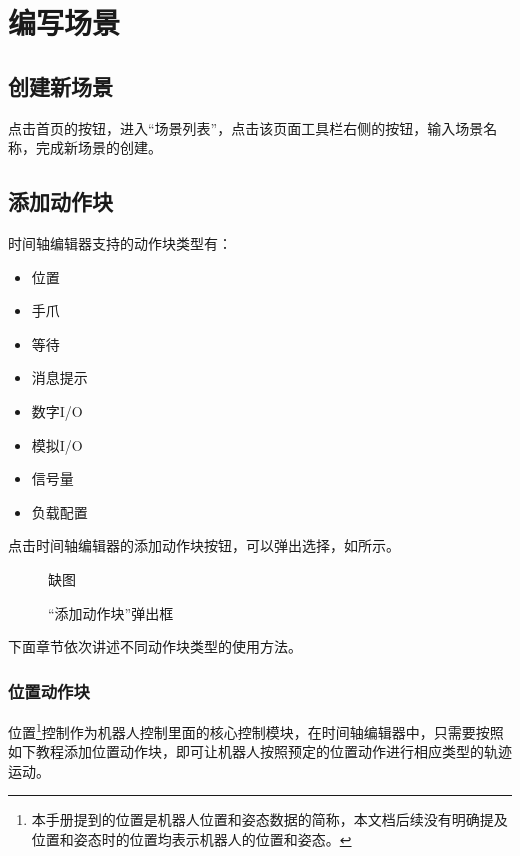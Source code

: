 

\section{编写场景}
\subsection{创建新场景}
点击\LM 首页的按钮，进入“场景列表”，点击该页面工具栏右侧的按钮，输入场景名称，完成新场景的创建。

\subsection{添加动作块}

时间轴编辑器支持的动作块类型有：
\begin{itemize}
\item 位置
\item 手爪
\item 等待
\item 消息提示
\item 数字I/O
\item 模拟I/O
\item 信号量
\item 负载配置
\end{itemize}

点击时间轴编辑器的添加动作块按钮，可以弹出选择，如所示。

\begin{figure}[ht]
	\centering
	\color{red}缺图
	\caption{“添加动作块”弹出框}
	\label{fig:添加动作块弹出框}
\end{figure}

下面章节依次讲述不同动作块类型的使用方法。

\subsubsection{位置动作块}
位置\footnote{本手册提到的位置是机器人位置和姿态数据的简称，本文档后续没有明确提及位置和姿态时的位置均表示机器人的位置和姿态。}控制作为机器人控制里面的核心控制模块，在时间轴编辑器中，只需要按照如下教程添加位置动作块，即可让机器人按照预定的位置动作进行相应类型的轨迹运动。
